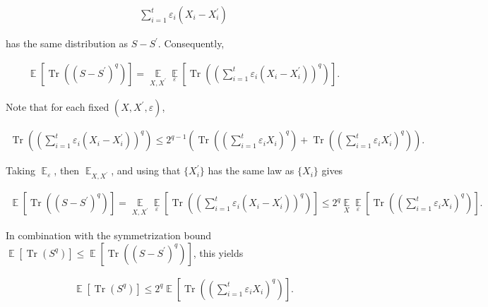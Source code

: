 \[\begin{gathered}
\sum_{i=1}^{t}\varepsilon_{i}\left(X_{i}-X_{i}^{\prime}\right)
\end{gathered}\]


has the same distribution as $S-S^{\prime}$.
Consequently,\par


\[\begin{gathered}
\operatorname*{\mathbb{E}}\left[\operatorname*{Tr}\left((S-S^{\prime})^{q}\right)\right]=\operatorname*{\mathbb{E}}_{X,X^{\prime}}\operatorname*{\mathbb{E}}_{\varepsilon}\left[\operatorname*{Tr}\left(\left(\sum_{i=1}^{t}\varepsilon_{i}(X_{i}-X_{i}^{\prime})\right)^{q}\right)\right].
\end{gathered}\]




Note that for each fixed $(X,X^{\prime},\varepsilon)$,\par


\[\begin{gathered}
\operatorname*{Tr}\left(\left(\sum_{i=1}^{t}\varepsilon_{i}(X_{i}-X_{i}^{\prime})\right)^{q}\right)\leq 2^{q-1}\left(\operatorname*{Tr}\left((\sum_{i=1}^{t}\varepsilon_{i}X_{i})^{q}\right)+\operatorname*{Tr}\left((\sum_{i=1}^{t}\varepsilon_{i}X_{i}^{\prime})^{q}\right)\right).
\end{gathered}\]


Taking $\operatorname*{\mathbb{E}}_{\varepsilon}$, then $\operatorname*{\mathbb{E}}_{X,X^{\prime}}$, and using that $\{X_{i}^{\prime}\}$ has the same law as $\{X_{i}\}$ gives\par


\[\begin{gathered}
\operatorname*{\mathbb{E}}\left[\operatorname*{Tr}\left((S-S^{\prime})^{q}\right)\right]=\operatorname*{\mathbb{E}}_{X,X^{\prime}}\operatorname*{\mathbb{E}}_{\varepsilon}\left[\operatorname*{Tr}\left((\sum_{i=1}^{t}\varepsilon_{i}(X_{i}-X_{i}^{\prime}))^{q}\right)\right]\leq 2^{q}\operatorname*{\mathbb{E}}_{X}\operatorname*{\mathbb{E}}_{\varepsilon}\left[\operatorname*{Tr}\left((\sum_{i=1}^{t}\varepsilon_{i}X_{i})^{q}\right)\right].
\end{gathered}\]


In combination with the symmetrization bound
$\operatorname*{\mathbb{E}}[\operatorname*{Tr}(S^{q})]\leq\operatorname*{\mathbb{E}}[\operatorname*{Tr}((S-S^{\prime})^{q})]$,
this yields\par


\[\begin{gathered}
\operatorname*{\mathbb{E}}\left[\operatorname*{Tr}(S^{q})\right]\leq 2^{q}\operatorname*{\mathbb{E}}\left[\operatorname*{Tr}\left((\sum_{i=1}^{t}\varepsilon_{i}X_{i})^{q}\right)\right].
\end{gathered}\]


